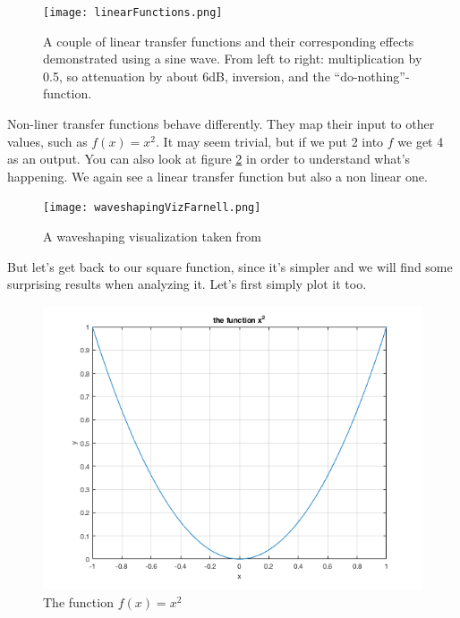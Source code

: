 \begin{figure}[h!]
	\centering
	\texttt{[image: linearFunctions.png]}
	\caption[shortCaption]
	{A couple of linear transfer functions and their corresponding effects demonstrated using a sine wave. From left to right: multiplication by 0.5, so attenuation by about 6dB, inversion, and the ``do-nothing''-function.}
	\label{fig:linears}
\end{figure}


Non-liner transfer functions behave differently. They map their input to other values, such as $f(x) = x^2$. It may seem trivial, but if we put 2 into $f$ we get 4 as an output. You can also look at figure \ref{fig:farnellWaveShaping} in order to understand what's happening. We again see a linear transfer function but also a non linear one. 
\begin{figure}[H]
	\centering
	\texttt{[image: waveshapingVizFarnell.png]}
	\caption[farnell wave shaping visualization]
	{A waveshaping visualization taken from \cite{farnell_designing_2010}}
	\label{fig:farnellWaveShaping}
\end{figure}

But let's get back to our square function, since it's simpler and we will find some surprising results when analyzing it. Let's first simply plot it too. 


\begin{figure}[H]
	\begin{center}
		\includegraphics[width = 14cm]{img/squareFunction.png}
		\caption{The function $f(x)=x^2$}
		\label{fig:square}
	\end{center}
\end{figure}

